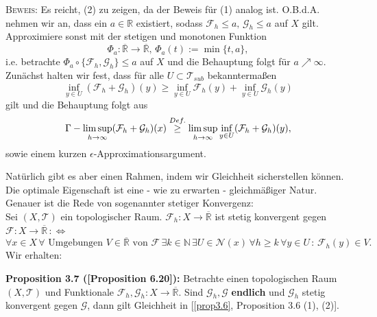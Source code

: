 \textsc{Beweis:} Es reicht, (2) zu zeigen, da der Beweis für (1) analog ist. O.B.d.A. nehmen wir an, dass ein \(a \in \mathbb{R}\) existiert, sodass \(\mathcal{F}_h \leq a, \, \mathcal{G}_h \leq a\) auf \(X\) gilt. Approximiere sonst mit der stetigen und monotonen Funktion
\begin{equation}
    \Phi_a : \overline{\mathbb{R}} \to \overline{\mathbb{R}}, \, \Phi_a(t) := \min\{t,a\},
\end{equation}
i.e. betrachte \(\Phi_a \circ \{\mathcal{F}_h, \mathcal{G}_h\} \leq a\) auf \(X\) und die Behauptung folgt für \(a \nearrow \infty\).\\
Zunächst halten wir fest, dass für alle \(U \subset \mathcal{T}_{sub}\) bekanntermaßen
\begin{equation}
    \inf_{y \in U} (\mathcal{F}_h + \mathcal{G}_h)(y) \geq \inf_{y \in U} \mathcal{F}_h(y) + \inf_{y \in U} \mathcal{G}_h(y)
\end{equation}
gilt und die Behauptung folgt aus
\begin{equation}
    \Gamma - \limsup_{h \to \infty} (\mathcal{F}_h + \mathcal{G}_h)(x) \stackrel{Def.}{\geq} \limsup_{h \to \infty} \inf_{y \in U} (\mathcal{F}_h + \mathcal{G}_h)(y),
\end{equation}
sowie einem kurzen \(\epsilon\)-Approximationsargument. \QEDB

Natürlich gibt es aber einen Rahmen, indem wir Gleichheit sicherstellen können. Die optimale Eigenschaft ist eine - wie zu erwarten - gleichmäßiger Natur. Genauer ist die Rede von sogenannter stetiger Konvergenz:\\
Sei \((X,\mathcal{T})\) ein topologischer Raum. \(\mathcal{F}_h : X \to \overline{\mathbb{R}}\) ist stetig konvergent gegen \\ \(\mathcal{F} : X \to \overline{\mathbb{R}} \, : \Leftrightarrow\)
\begin{equation}
    \forall x \in X \, \forall \text{ Umgebungen }V \in \overline{\mathbb{R}} \text{ von }\mathcal{F} \, \exists k \in \mathbb{N} \, \exists U \in \mathcal{N}(x) \, \forall h \geq k \, \forall y \in U \, : \, \mathcal{F}_h(y) \in V.
\end{equation}
Wir erhalten:\\[0.5cm]
\colorbox{generalYellow}{\begin{minipage}{16cm}{\textcolor{black}{}{\label{prop3.7}}}
\textbf{Proposition 3.7 (\cite{MasoGamma}[Proposition 6.20]):} Betrachte einen topologischen Raum \((X,\mathcal{T})\) und Funktionale \(\mathcal{F}_h, \mathcal{G}_h : X \to \overline{\mathbb{R}}\). Sind \(\mathcal{G}_h, \mathcal{G}\) \textbf{endlich} und \(\mathcal{G}_h\) stetig konvergent gegen \(\mathcal{G}\), dann gilt Gleichheit in [\ref{prop3.6}, Proposition 3.6 (1), (2)].
\end{minipage}}

